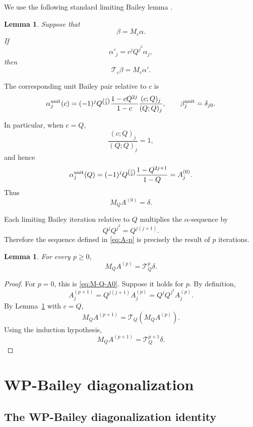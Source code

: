 \documentclass[11pt]{amsart}
\newtheorem{lemma}[theorem]{Lemma}
\begin{document}
We use the following standard limiting Bailey lemma \cite{AndrewsQSeries}.
\begin{lemma}\label{lem:limiting-bailey}
Suppose that
\[
\beta=M_c\alpha.
\]
If
\[
\alpha'_j=c^jQ^{j^2}\alpha_j,
\]
then
\[
\mathcal T_c\beta=M_c\alpha'.
\]
\end{lemma}


The corresponding unit Bailey pair relative to \(c\) is
\begin{equation}\label{eq:unit-Bailey}
\alpha_j^{\rm unit}(c)
=
(-1)^j
Q^{\binom{j}{2}}
\frac{1-cQ^{2j}}{1-c}
\frac{(c;Q)_j}{(Q;Q)_j},
\qquad
\beta_j^{\rm unit}
=
\delta_{j0}.
\end{equation}

In particular, when \(c=Q\),
\[
\frac{(c;Q)_j}{(Q;Q)_j}=1,
\]
and hence
\[
\alpha_j^{\rm unit}(Q)
=
(-1)^j
Q^{\binom{j}{2}}
\frac{1-Q^{2j+1}}{1-Q}
=
A_j^{(0)}.
\]
Thus
\begin{equation}\label{eq:M-Q-A0}
M_QA^{(0)}
=
\delta.
\end{equation}

Each limiting Bailey iteration relative to \(Q\) multiplies the
\(\alpha\)-sequence by
\[
Q^jQ^{j^2}
=
Q^{j(j+1)}.
\]
Therefore the sequence defined in \eqref{eq:A-p} is precisely the
result of \(p\) iterations.

\begin{lemma}\label{lem:Ap-Bailey}
For every \(p\geq0\),
\begin{equation}\label{eq:MQAp}
M_QA^{(p)}
=
\mathcal T_Q^p\delta.
\end{equation}
\end{lemma}

\begin{proof}
For \(p=0\), this is \eqref{eq:M-Q-A0}.
Suppose it holds for \(p\).
By definition,
\[
A_j^{(p+1)}
=
Q^{j(j+1)}A_j^{(p)}
=
Q^jQ^{j^2}A_j^{(p)}.
\]
By Lemma~\ref{lem:limiting-bailey} with \(c=Q\),
\[
M_QA^{(p+1)}
=
\mathcal T_Q(M_QA^{(p)}).
\]
Using the induction hypothesis,
\[
M_QA^{(p+1)}
=
\mathcal T_Q^{p+1}\delta.
\]
\end{proof}



\section{WP-Bailey diagonalization}
\label{sec:diagonalization}

\subsection{The WP-Bailey diagonalization identity}
\end{document}
